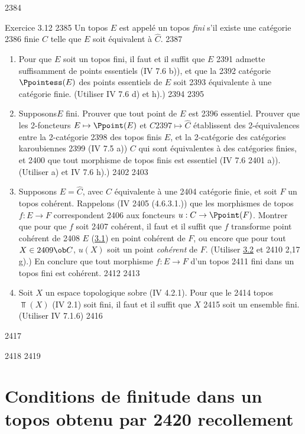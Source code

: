   2384	\begin{enonce*}[remark]{Exercice 3.12}
  2385	Un topos $E$ est appelé un topos \emph{fini} s'il existe une catégorie
  2386	finie $C$ telle que $E$ soit équivalent à $\widehat{C}$.
  2387	\begin{enumerate}
  2388	\renewcommand{\theenumi}{\alph{enumi}}
  2389	\renewcommand{\labelenumi}{\theenumi)}
  2390	\item Pour que $E$ soit un topos fini, il faut et il suffit que $E$
  2391	  admette suffisamment de points essentiels (IV 7.6 b)), et que la
  2392	  catégorie $\Ppointess(E)$ des points essentiels de $E$ soit
  2393	  équivalente à une catégorie finie. (Utiliser IV 7.6 d) et h).)
  2394	
  2395	\item Supposons\pageoriginale $E$ fini. Prouver que tout point de $E$ est
  2396	  essentiel. Prouver que les 2-foncteurs $E \mapsto \Ppoint(E)$ et $C
  2397	  \mapsto \widehat{C}$ établissent des 2-équivalences entre la 2-catégorie
  2398	  des topos finis $E$, et la 2-catégorie des catégories karoubiennes
  2399	  (IV 7.5 a)) $C$ qui sont équivalentes à des catégories finies, et
  2400	  que tout morphisme de topos finis est essentiel (IV 7.6
  2401	  a)). (Utiliser a) et IV 7.6 h).)
  2402	
  2403	\item Supposons $E = \widehat{C}$, avec $C$ équivalente à une
  2404	  catégorie finie, et soit $F$ un topos cohérent. Rappelons (IV
  2405	  (4.6.3.1.)) que les morphismes de topos $f : E \to F$ correspondent
  2406	  aux foncteurs $u : C \to \Ppoint(F)$. Montrer que pour que $f$ soit
  2407	  cohérent, il faut et il suffit que $f$ transforme point cohérent de
  2408	  $E$ (\hyperref[VI.def3.1]{3.1}) en point cohérent de $F$, ou encore que pour tout $X \in
  2409	  \ob C$, $u(X)$ soit un point \emph{cohérent} de $F$. (Utiliser \hyperref[VI.prop3.2]{3.2} et
  2410	  2,17 g).) En conclure que tout morphisme $f : E \to F$ d'un topos
  2411	  fini dans un topos fini est cohérent.
  2412	
  2413	\item Soit $X$ un espace topologique sobre (IV 4.2.1). Pour que le
  2414	  topos $\Top(X)$ (IV 2.1) soit fini, il faut et il suffit que $X$
  2415	  soit un ensemble fini. (Utiliser IV 7.1.6)
  2416	\end{enumerate}
  2417	\end{enonce*}
  2418	
  2419	\section{Conditions de finitude dans un topos obtenu par
  2420	  recollement}
